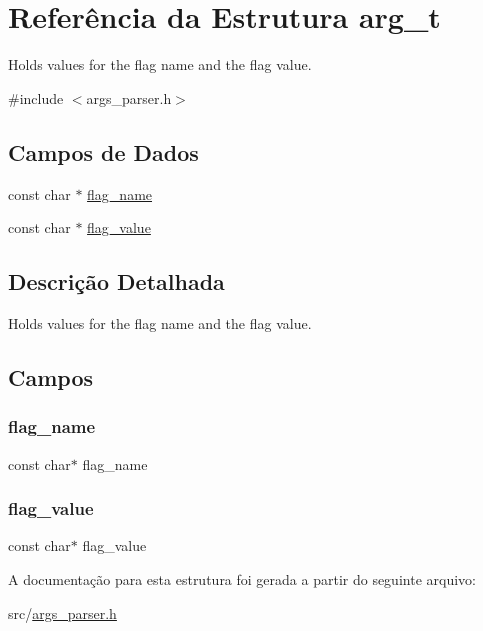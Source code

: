 \hypertarget{structarg__t}{}\section{Referência da Estrutura arg\+\_\+t}
\label{structarg__t}


Holds values for the flag name and the flag value.  




{\ttfamily \#include $<$args\+\_\+parser.\+h$>$}

\subsection*{Campos de Dados}
\begin{DoxyCompactItemize}
\item 
const char $\ast$ \hyperlink{structarg__t_a932cfe87aa4a733c5fa1efc03b3b5ffd}{flag\+\_\+name}
\item 
const char $\ast$ \hyperlink{structarg__t_a33da39d83466fb384766d9292cb7292a}{flag\+\_\+value}
\end{DoxyCompactItemize}


\subsection{Descrição Detalhada}
Holds values for the flag name and the flag value. 

\subsection{Campos}
\mbox{\label{structarg__t_a932cfe87aa4a733c5fa1efc03b3b5ffd}} 
\subsubsection{\texorpdfstring{flag\+\_\+name}{flag\_name}}
{\footnotesize\ttfamily const char$\ast$ flag\+\_\+name}

\mbox{\label{structarg__t_a33da39d83466fb384766d9292cb7292a}} 
\subsubsection{\texorpdfstring{flag\+\_\+value}{flag\_value}}
{\footnotesize\ttfamily const char$\ast$ flag\+\_\+value}



A documentação para esta estrutura foi gerada a partir do seguinte arquivo\+:\begin{DoxyCompactItemize}
\item 
src/\hyperlink{args__parser_8h}{args\+\_\+parser.\+h}\end{DoxyCompactItemize}
